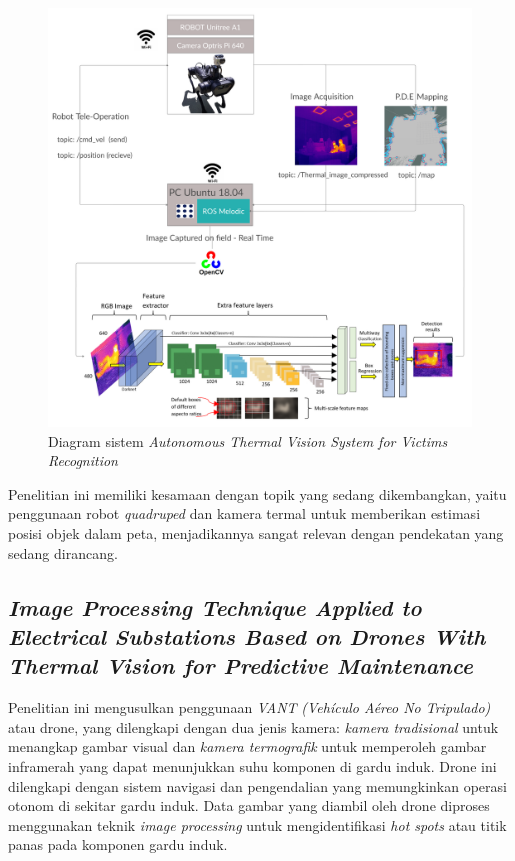 \begin{figure} [H] \centering
  \includegraphics[scale=0.059]{gambar/bab2/unitreea1.png}
  \caption{Diagram sistem \emph{Autonomous Thermal Vision System for Victims Recognition} \cite{Cruz2021}}
  \label{fig:Quadruped  dengan kamera termal untuk deteksi korban}
\end{figure}

Penelitian ini memiliki kesamaan dengan topik yang sedang dikembangkan, yaitu penggunaan robot \emph{quadruped} dan kamera termal untuk memberikan estimasi posisi objek dalam peta, menjadikannya sangat relevan dengan pendekatan yang sedang dirancang.



\subsection{\emph{Image Processing Technique Applied to Electrical
Substations Based on Drones With Thermal Vision
for Predictive Maintenance}}
Penelitian ini mengusulkan penggunaan \emph{VANT} \emph{(Vehículo Aéreo No Tripulado)} atau drone, yang dilengkapi dengan dua jenis kamera: \emph{kamera tradisional} untuk menangkap gambar visual dan \emph{kamera termografik} untuk memperoleh gambar inframerah yang dapat menunjukkan suhu komponen di gardu induk. Drone ini dilengkapi dengan sistem navigasi dan pengendalian yang memungkinkan operasi otonom di sekitar gardu induk. Data gambar yang diambil oleh drone diproses menggunakan teknik \emph{image processing} untuk mengidentifikasi \emph{hot spots} atau titik panas pada komponen gardu induk.


